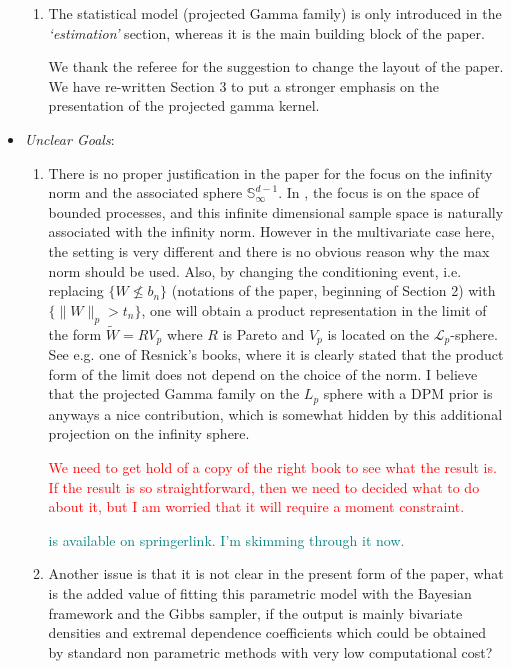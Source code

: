\documentclass[10pt]{article}
\newcommand{\comment}[1]{\textcolor{teal}{#1}}
\newcommand{\bruno}[1]{\textcolor{red}{#1}}
\begin{document}
\begin{itemize}
\begin{enumerate}
        \item The statistical model (projected Gamma family) is only introduced in the
            \emph{‘estimation’} section, whereas it is the main building block of the paper.

            We thank the referee for the suggestion to change the layout of the paper. We have
            re-written Section 3 to put a stronger emphasis on the presentation of the
            projected gamma kernel.
            
        \end{enumerate}

    \item \emph{Unclear Goals}: 
    \begin{enumerate}
        \item There is no proper justification in the paper for the focus on the infinity norm 
        and the associated sphere $\mathbb{S}_{\infty}^{d-1}$. In \cite{ferreira2014}, the focus
        is on the space of bounded processes, and this infinite dimensional sample space is 
        naturally associated with the infinity norm. However in the multivariate case here, the 
        setting is very different and there is no obvious reason why the max norm should be used. 
        Also, by changing the conditioning event, i.e. replacing $\lbrace W \not\leq b_{n}\rbrace$
        (notations of the paper, beginning of Section 2) with 
        $\lbrace \lVert W\rVert_p > t_n\rbrace$, one will obtain a product representation in the 
        limit of the form $\tilde{W} = RV_p$ where $R$ is Pareto and $V_p$ is located on the 
        $\mathcal{L}_p$-sphere. See e.g. one of Resnick’s books, where it is clearly stated that 
        the product form of the limit does not depend on the choice of the norm. I believe that 
        the projected Gamma family on the $L_p$ sphere with a DPM prior is anyways a nice 
        contribution, which is somewhat hidden by this additional projection on the infinity sphere.

        \bruno{We need to get hold of a copy of the right book to see what the result is. If the result 
        is so straightforward, then we need to decided what to do about it, but I am worried that
        it will require a moment constraint.}

        \comment{\cite{resnick2008extreme} is available on springerlink.  I'm skimming through it now.}
        
        \item Another issue is that it is not clear in the present form of the paper, what is the
        added value of fitting this parametric model with the Bayesian framework and the Gibbs 
        sampler, if the output is mainly bivariate densities and extremal dependence coefficients 
        which could be obtained by standard non parametric methods with very low computational cost?


\end{enumerate}
\end{itemize}
\end{document}
